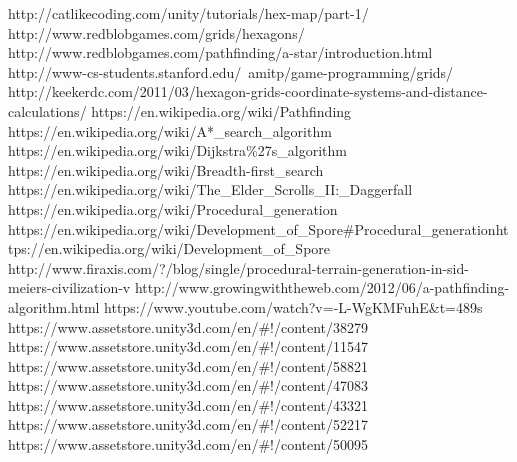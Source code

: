 \begin{thebibliography}{x}
 http://catlikecoding.com/unity/tutorials/hex-map/part-1/
 http://www.redblobgames.com/grids/hexagons/
 http://www.redblobgames.com/pathfinding/a-star/introduction.html
 http://www-cs-students.stanford.edu/~amitp/game-programming/grids/
 http://keekerdc.com/2011/03/hexagon-grids-coordinate-systems-and-distance-calculations/
 https://en.wikipedia.org/wiki/Pathfinding
 https://en.wikipedia.org/wiki/A*\_search\_algorithm
 https://en.wikipedia.org/wiki/Dijkstra\%27s\_algorithm
 https://en.wikipedia.org/wiki/Breadth-first\_search
 https://en.wikipedia.org/wiki/The\_Elder\_Scrolls\_II:\_Daggerfall
 https://en.wikipedia.org/wiki/Procedural\_generation
 https://en.wikipedia.org/wiki/Development\_of\_Spore\#Procedural\_generationhttps://en.wikipedia.org/wiki/Development\_of\_Spore
 http://www.firaxis.com/?/blog/single/procedural-terrain-generation-in-sid-meiers-civilization-v
 http://www.growingwiththeweb.com/2012/06/a-pathfinding-algorithm.html
 https://www.youtube.com/watch?v=-L-WgKMFuhE\&t=489s
 https://www.assetstore.unity3d.com/en/\#!/content/38279
 https://www.assetstore.unity3d.com/en/\#!/content/11547
 https://www.assetstore.unity3d.com/en/\#!/content/58821
 https://www.assetstore.unity3d.com/en/\#!/content/47083
 https://www.assetstore.unity3d.com/en/\#!/content/43321
 https://www.assetstore.unity3d.com/en/\#!/content/52217
 https://www.assetstore.unity3d.com/en/\#!/content/50095
\end{thebibliography}
